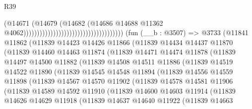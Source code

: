 \begin{lexlean}{R39}
\begin{coremodule}
                                                                      (@14671
                                                                        (@14679
                                                                          (@14682
                                                                            (@14686
                                                                              @14688
                                                                              @11362
                                                                              @4062)))))))))))))))))))))))))))))))))))))
    (fun (__b : @3507) =>
    @3733
      (@11841
        @11862
        (@11839
          @14423
          @14426
          @11866
          (@11839
            @14434
            @14437
            @11870
            (@11839
              @14460
              @14463
              @11874
              (@11839
                @14471
                @14474
                @11878
                (@11839
                  @14497
                  @14500
                  @11882
                  (@11839
                    @14508
                    @14511
                    @11886
                    (@11839
                      @14519
                      @14522
                      @11890
                      (@11839
                        @14545
                        @14548
                        @11894
                        (@11839
                          @14556
                          @14559
                          @11898
                          (@11839
                            @14567
                            @14570
                            @11902
                            (@11839
                              @14578
                              @14581
                              @11906
                              (@11839
                                @14589
                                @14592
                                @11910
                                (@11839
                                  @14600
                                  @14603
                                  @11914
                                  (@11839
                                    @14626
                                    @14629
                                    @11918
                                    (@11839
                                      @14637
                                      @14640
                                      @11922
                                      (@11839
                                        @14663

\end{coremodule}
\end{lexlean}
